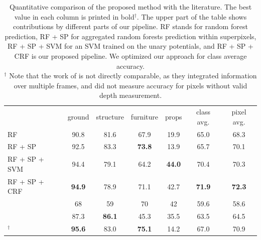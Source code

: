 \begin{table}[t]
\begin{tabularx}{\linewidth}{@{\extracolsep{\fill}}l@{}cccccc}
\toprule
                        & \footnotesize{ground}        &  \footnotesize{structure}    & \footnotesize{furniture}     & \footnotesize{props}         & \footnotesize{class avg.}   & \footnotesize{pixel avg.}\\
\cmidrule{1-7}

RF                              &         90.8  &   81.6        & 67.9          & 19.9          &  65.0        &  68.3 \\
RF + SP                         &         92.5  &   83.3        & \textbf{73.8} & 13.9          &  65.7        &  70.1 \\ 
RF + SP + SVM                   &         94.4  &   79.1        & 64.2          & \textbf{44.0} &  70.4        &  70.3 \\
RF + SP + CRF                   & \textbf{94.9} &   78.9        &          71.1 & 42.7          &\textbf{71.9} &  \textbf{72.3} \\
\cmidrule{1-7}
\citet{SilbermanECCV12}         &         68    &   59          & 70           & 42            &  59.6        & 58.6 \\
\citet{couprie-iclr-13}         &         87.3  & \textbf{86.1} & 45.3         & 35.5          &  63.5        & 64.5 \\
\cmidrule{1-7}
\citet{stueckler2013}$^\dagger$ & \textbf{95.6} &   83.0        & \textbf{75.1}& 14.2          &  67.0        & 70.9 \\

\bottomrule
\end{tabularx}
    \caption{Quantitative comparison of the proposed method with the
        literature.
The best value in each column is printed in bold$^\dagger$. The upper part of
the table shows contributions by different parts of our pipeline. RF stands for random forest prediction, RF + SP for aggregated
random forests prediction within superpixels, RF + SP + SVM for an SVM trained on the unary potentials, and RF + SP + CRF is
our proposed pipeline. We optimized our approach for class average
accuracy.\\
$^\dagger$ \footnotesize Note that the work of \citet{stueckler2013} is not directly
comparable, as they integrated information over multiple frames, and did not
measure accuracy for pixels without valid depth measurement.}
\end{table}

